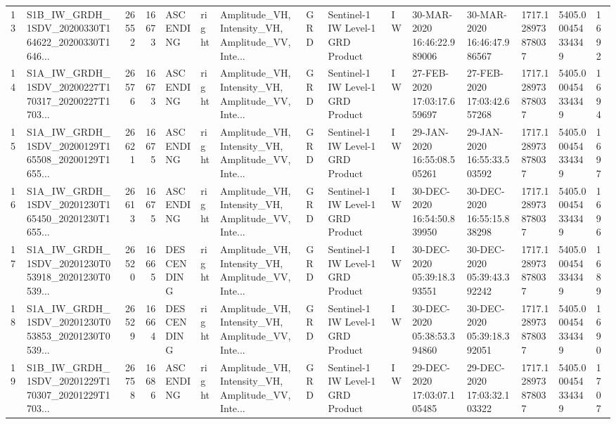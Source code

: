 \begin{tabular}{llrrlllllllllll}
13  &  S1B\_IW\_GRDH\_1SDV\_20200330T164622\_20200330T1646... &  26552 &   16673 &   ASCENDING &  right &  Amplitude\_VH, Intensity\_VH, Amplitude\_VV, Inte... &          GRD &  Sentinel-1 IW Level-1 GRD Product &              IW &  30-MAR-2020 16:46:22.989006 &  30-MAR-2020 16:46:47.986567 &          1717.128973878037 &  5405.000454334349 &       1692 \\
14  &  S1A\_IW\_GRDH\_1SDV\_20200227T170317\_20200227T1703... &  26576 &   16673 &   ASCENDING &  right &  Amplitude\_VH, Intensity\_VH, Amplitude\_VV, Inte... &          GRD &  Sentinel-1 IW Level-1 GRD Product &              IW &  27-FEB-2020 17:03:17.659697 &  27-FEB-2020 17:03:42.657268 &          1717.128973878037 &  5405.000454334349 &       1694 \\
15  &  S1A\_IW\_GRDH\_1SDV\_20200129T165508\_20200129T1655... &  26621 &   16675 &   ASCENDING &  right &  Amplitude\_VH, Intensity\_VH, Amplitude\_VV, Inte... &          GRD &  Sentinel-1 IW Level-1 GRD Product &              IW &  29-JAN-2020 16:55:08.505261 &  29-JAN-2020 16:55:33.503592 &          1717.128973878037 &  5405.000454334349 &       1697 \\
16  &  S1A\_IW\_GRDH\_1SDV\_20201230T165450\_20201230T1655... &  26613 &   16675 &   ASCENDING &  right &  Amplitude\_VH, Intensity\_VH, Amplitude\_VV, Inte... &          GRD &  Sentinel-1 IW Level-1 GRD Product &              IW &  30-DEC-2020 16:54:50.839950 &  30-DEC-2020 16:55:15.838298 &          1717.128973878037 &  5405.000454334349 &       1696 \\
17  &  S1A\_IW\_GRDH\_1SDV\_20201230T053918\_20201230T0539... &  26520 &   16665 &  DESCENDING &  right &  Amplitude\_VH, Intensity\_VH, Amplitude\_VV, Inte... &          GRD &  Sentinel-1 IW Level-1 GRD Product &              IW &  30-DEC-2020 05:39:18.393551 &  30-DEC-2020 05:39:43.392242 &          1717.128973878037 &  5405.000454334349 &       1689 \\
18  &  S1A\_IW\_GRDH\_1SDV\_20201230T053853\_20201230T0539... &  26529 &   16664 &  DESCENDING &  right &  Amplitude\_VH, Intensity\_VH, Amplitude\_VV, Inte... &          GRD &  Sentinel-1 IW Level-1 GRD Product &              IW &  30-DEC-2020 05:38:53.394860 &  30-DEC-2020 05:39:18.392051 &          1717.128973878037 &  5405.000454334349 &       1690 \\
19  &  S1B\_IW\_GRDH\_1SDV\_20201229T170307\_20201229T1703... &  26758 &   16686 &   ASCENDING &  right &  Amplitude\_VH, Intensity\_VH, Amplitude\_VV, Inte... &          GRD &  Sentinel-1 IW Level-1 GRD Product &              IW &  29-DEC-2020 17:03:07.105485 &  29-DEC-2020 17:03:32.103322 &          1717.128973878037 &  5405.000454334349 &       1707 \\

\end{tabular}
